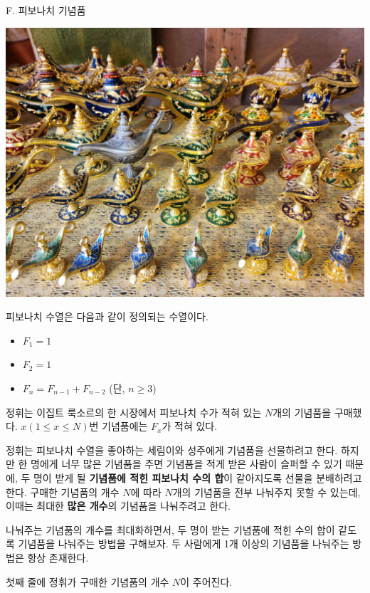 \def\probtitle{피보나치 기념품}
\def\probno{F} %

\begin{problem}{\probno{}. \probtitle{}}

\begin{center}
    \includegraphics[width=0.65\linewidth]{2024/fibonacci-partition/image/lamp.jpg}
\end{center}

피보나치 수열은 다음과 같이 정의되는 수열이다.

\begin{itemize}[topsep=0pt,noitemsep]
    \item $F_1 = 1$
    \item $F_2 = 1$
    \item $F_n = F_{n-1} + F_{n-2}$ (단, $n \ge 3$)
\end{itemize}

정휘는 이집트 룩소르의 한 시장에서 피보나치 수가 적혀 있는 $N$개의 기념품을 구매했다. $x (1 \le x \le N)$번 기념품에는 $F_x$가 적혀 있다.

정휘는 피보나치 수열을 좋아하는 세림이와 성주에게 기념품을 선물하려고 한다. 하지만 한 명에게 너무 많은 기념품을 주면 기념품을 적게 받은 사람이 슬퍼할 수 있기 때문에, 두 명이 받게 될 \textbf{기념품에 적힌 피보나치 수의 합}이 같아지도록 선물을 분배하려고 한다. 구매한 기념품의 개수 $N$에 따라 $N$개의 기념품을 전부 나눠주지 못할 수 있는데, 이때는 최대한 \textbf{많은 개수}의 기념품을 나눠주려고 한다.

나눠주는 기념품의 개수를 최대화하면서, 두 명이 받는 기념품에 적힌 수의 합이 같도록 기념품을 나눠주는 방법을 구해보자. 두 사람에게 1개 이상의 기념품을 나눠주는 방법은 항상 존재한다.

\InputFile

첫째 줄에 정휘가 구매한 기념품의 개수 $N$이 주어진다.

\OutputFile


\end{problem}
